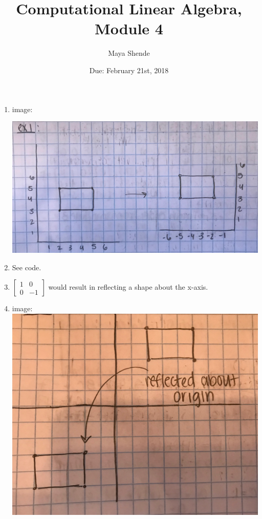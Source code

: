 \documentclass{article}
\title{Computational Linear Algebra, Module 4}
\author{Maya Shende}
\date{Due: February 21st, 2018}
\begin{document}
\maketitle
	
\begin{enumerate}
	\item image:
	
	\includegraphics[scale=0.1]{exercise1}
	
	
	\item See code.
	
	\item $
	\begin{bmatrix}
		1	&0\\
		0	&-1
	\end{bmatrix}
	$ would result in reflecting a shape about the x-axis. 
	
	\item image:
	\includegraphics[scale=0.05]{exercise4}
	

\end{enumerate}
\end{document}
